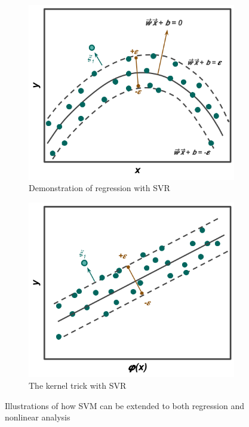 \begin{figure}[!hp]
  \centering
  \begin{subfigure}[h]{0.8\linewidth}
    \includegraphics[width=\linewidth]{./chapters/litrev/svr-a.png}
    \caption{Demonstration of regression with \gls{SVR}}
    \label{fig:svr-a}
  \end{subfigure}
  \begin{subfigure}[h]{0.8\linewidth}
    \includegraphics[width=\linewidth]{./chapters/litrev/svr-b.png}
    \caption{The kernel trick with \gls{SVR}}
    \label{fig:svr-b}
  \end{subfigure}
  \caption{Illustrations of how \gls{SVM} can be extended to both regression and nonlinear analysis}
  \label{fig:svr}
\end{figure}

